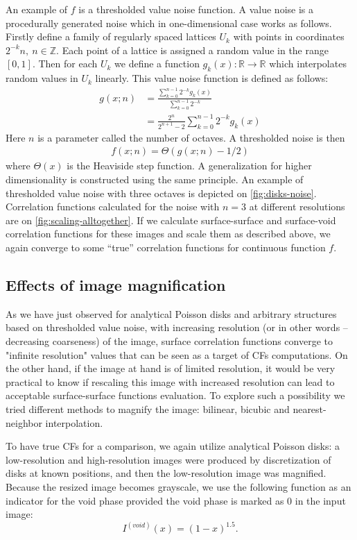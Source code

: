\documentclass[reprint,amsmath,amssymb,aps,pre,showkeys,showpacs]{revtex4-1}
\begin{document}
An example of $f$ is a thresholded value noise function. A value noise is a
procedurally generated noise which in one-dimensional case works as
follows. Firstly define a family of regularly spaced lattices $U_k$ with points
in coordinates $2^{-k}n,\ n \in \mathbb{Z}$. Each point of a lattice is assigned
a random value in the range $[0, 1]$. Then for each $U_k$ we define a
function $g_k(x): \mathbb{R} \rightarrow \mathbb{R}$ which interpolates random
values in $U_k$ linearly. This value noise function is defined as follows:
\begin{align*}
  g(x; n) &= \frac{\sum\limits_{k=0}^{n-1} 2^{-k}g_k(x)}{\sum\limits_{k=0}^{n-1}
    2^{-k}} \\
  &= \frac{2^n}{2^{n+1}-2} \sum\limits_{k=0}^{n-1} 2^{-k}g_k(x)
\end{align*}
Here $n$ is a parameter called the number of octaves. A thresholded noise is then
\begin{align*}
  f(x; n) = \Theta(g(x; n) - 1/2)
\end{align*}
where $\Theta(x)$ is the Heaviside step function. A generalization for higher
dimensionality is constructed using the same principle. An example of
thresholded value noise with three octaves is depicted on
\cref{fig:disks-noise}. Correlation functions calculated for the noise with
$n = 3$ at different resolutions are on \cref{fig:scaling-alltogether}. If we
calculate surface-surface and surface-void correlation functions for these
images and scale them as described above, we again converge to some ``true''
correlation functions for continuous function $f$.

\subsection{Effects of image magnification}
\label{sec:magnify}
As we have just observed for analytical Poisson disks and arbitrary structures
based on thresholded value noise, with increasing resolution (or in other words
-- decreasing coarseness) of the image, surface correlation functions converge
to "infinite resolution" values that can be seen as a target of CFs
computations. On the other hand, if the image at hand is of limited
resolution, it would be very practical to know if rescaling this image with
increased resolution can lead to acceptable surface-surface functions
evaluation. To explore such a possibility we tried different methods to magnify
the image: bilinear, bicubic and nearest-neighbor interpolation.

To have true CFs for a comparison, we again utilize analytical Poisson disks: a
low-resolution and high-resolution images were produced by discretization of
disks at known positions, and then the low-resolution image was
magnified. Because the resized image becomes grayscale, we use the following
function as an indicator for the void phase provided the void phase is marked as
0 in the input image:
\begin{equation*}
  I^{(void)}(x) = (1 - x)^{1.5}.
\end{equation*}
\end{document}
